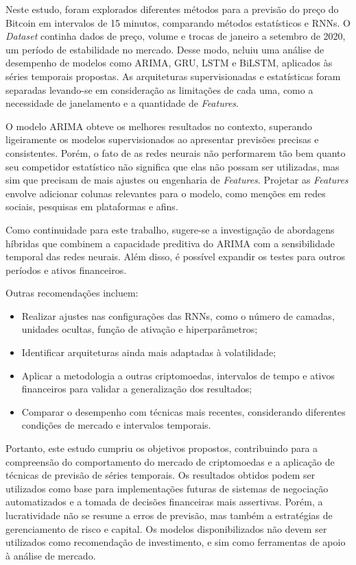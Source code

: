 Neste estudo, foram explorados diferentes métodos para a previsão do preço do Bitcoin em intervalos de 15 minutos, comparando métodos estatísticos e RNNs. 
O \textit{Dataset} continha dados de preço, volume e trocas de janeiro a setembro de 2020, um período de estabilidade no mercado. Desse modo, ncluiu uma análise de desempenho de modelos como ARIMA, GRU, LSTM e BiLSTM, aplicados às séries temporais propostas.
As arquiteturas supervisionadas e estatísticas foram separadas levando-se em consideração as limitações de cada uma, como a necessidade de janelamento e a quantidade de \textit{Features}.

O modelo ARIMA obteve os melhores resultados no contexto, superando ligeiramente os modelos supervisionados ao apresentar previsões precisas e consistentes.
Porém, o fato de as redes neurais não performarem tão bem quanto seu competidor estatístico não significa que elas não possam ser utilizadas, mas sim que precisam de mais ajustes ou engenharia de \textit{Features}. Projetar as \textit{Features} envolve adicionar colunas relevantes para o modelo, como menções em redes sociais, pesquisas em plataformas e afins.

Como continuidade para este trabalho, sugere-se a investigação de abordagens híbridas que combinem a capacidade preditiva do ARIMA com a sensibilidade temporal das redes neurais. Além disso, é possível expandir os testes para outros períodos e ativos financeiros. 

Outras recomendações incluem:

\begin{itemize}
    \item Realizar ajustes nas configurações das RNNs, como o número de camadas, unidades ocultas, função de ativação e hiperparâmetros;
    \item Identificar arquiteturas ainda mais adaptadas à volatilidade;
    \item Aplicar a metodologia a outras criptomoedas, intervalos de tempo e ativos financeiros para validar a generalização dos resultados;
    \item Comparar o desempenho com técnicas mais recentes, considerando diferentes condições de mercado e intervalos temporais.
\end{itemize}

Portanto, este estudo cumpriu os objetivos propostos, contribuindo para a compreensão do comportamento do mercado de criptomoedas e a aplicação de técnicas de previsão de séries temporais.
Os resultados obtidos podem ser utilizados como base para implementações futuras de sistemas de negociação automatizados e a tomada de decisões financeiras mais assertivas. 
Porém, a lucratividade não se resume a erros de previsão, mas também a estratégias de gerenciamento de risco e capital.
Os modelos disponibilizados não devem ser utilizados como recomendação de investimento, e sim como ferramentas de apoio à análise de mercado.
